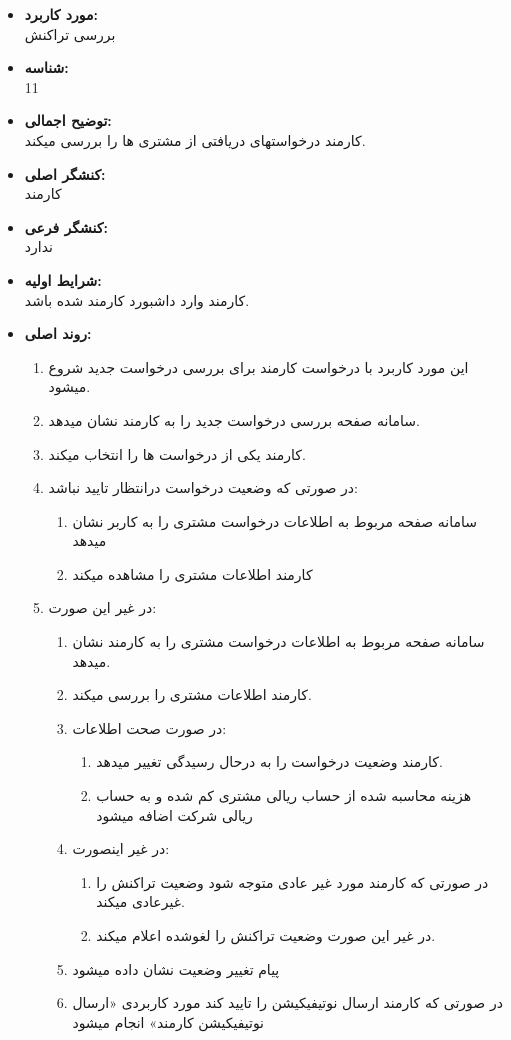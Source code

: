 \documentclass{article}
\begin{document}
\noindent\makebox[\linewidth]{\rule{\paperwidth}{0.4pt}}

\begin{itemize}
\item \textbf{مورد کاربرد:}\\
بررسی تراکنش
\item \textbf{شناسه:}\\
11
\item \textbf{توضیح اجمالی:}\\
کارمند درخواستهای دریافتی از مشتری ها را بررسی میکند.
\item \textbf{کنشگر اصلی:}\\
کارمند
\item \textbf{کنشگر فرعی:}\\
ندارد
\item \textbf{شرایط اولیه:}\\
کارمند وارد داشبورد کارمند شده باشد.
\item \textbf{روند اصلی:}\\
\begin{enumerate}
\item  این مورد کاربرد با درخواست کارمند برای بررسی درخواست جدید شروع میشود.
\item سامانه صفحه بررسی درخواست جدید را به کارمند نشان میدهد.
\item کارمند یکی از درخواست ها را انتخاب میکند.
\item در صورتی که وضعیت درخواست درانتظار تایید نباشد:
\begin{enumerate}
\item سامانه صفحه مربوط به اطلاعات درخواست مشتری را به کاربر نشان میدهد
\item کارمند اطلاعات مشتری را مشاهده میکند
\end{enumerate}
\item در غیر این صورت:
\begin{enumerate}
\item سامانه صفحه مربوط به اطلاعات درخواست مشتری را به کارمند نشان میدهد.
\item کارمند اطلاعات مشتری را بررسی میکند.
\item در صورت صحت اطلاعات:
\begin{enumerate}
\item کارمند وضعیت درخواست را به درحال رسیدگی تغییر میدهد.
\item هزینه محاسبه شده از حساب ریالی مشتری کم شده و به حساب ریالی شرکت اضافه میشود
\end{enumerate}
\item در غیر اینصورت:
\begin{enumerate}
\item  در صورتی که کارمند مورد غیر عادی متوجه شود وضعیت تراکنش را غیرعادی میکند.
\item در غیر این صورت وضعیت تراکنش را لغوشده اعلام میکند.
\end{enumerate}
\item پیام تغییر وضعیت نشان داده میشود
\item  در صورتی که کارمند ارسال نوتیفیکیشن را تایید کند مورد کاربردی  «ارسال نوتیفیکیشن کارمند» انجام میشود
\end{enumerate}


\end{enumerate}
\end{itemize}
\end{document}
